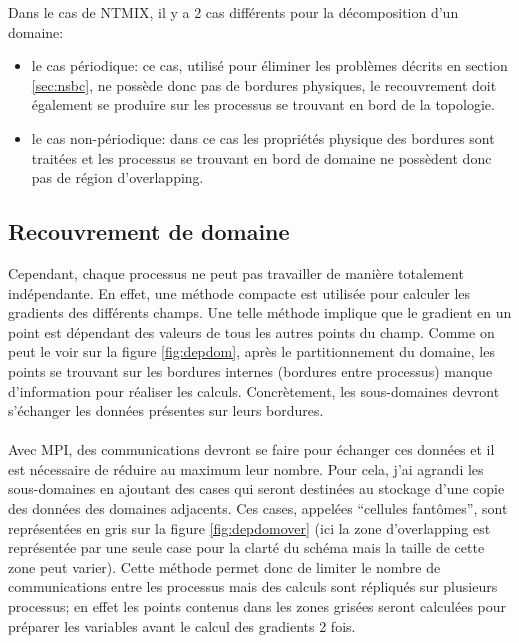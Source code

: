 Dans le cas de NTMIX, il y a 2 cas différents pour la décomposition d'un domaine:
\begin{itemize}
\item le cas périodique: ce cas, utilisé pour éliminer les problèmes décrits en section \ref{sec:nsbc}, ne possède donc pas de bordures physiques, le recouvrement doit également se produire sur les processus se trouvant en bord de la topologie.
\item le cas non-périodique: dans ce cas les propriétés physique des bordures sont traitées et les processus se trouvant en bord de domaine ne possèdent donc pas de région d'overlapping.
\end{itemize}


\subsection{Recouvrement de domaine}
Cependant, chaque processus ne peut pas travailler de manière totalement indépendante. En effet, une méthode compacte est utilisée pour calculer les gradients des différents champs. Une telle méthode implique que le gradient en un point est dépendant des valeurs de tous les autres points du champ. Comme on peut le voir sur la figure \ref{fig:depdom}, après le partitionnement du domaine, les points se trouvant sur les bordures internes (bordures entre processus) manque d'information pour réaliser les calculs. Concrètement, les sous-domaines devront s'échanger les données présentes sur leurs bordures. 

 \paragraph{}Avec MPI, des communications devront se faire pour échanger ces données et il est nécessaire de réduire au maximum leur nombre. Pour cela, j'ai agrandi les sous-domaines en ajoutant des cases qui seront destinées au stockage d'une copie des données des domaines adjacents. Ces cases, appelées ``cellules fantômes'', sont représentées en gris sur la figure \ref{fig:depdomover} (ici la zone d'overlapping est représentée par une seule case pour la clarté du schéma mais la taille de cette zone peut varier).
Cette méthode permet donc de limiter le nombre de communications entre les processus mais des calculs sont répliqués sur plusieurs processus; en effet les points contenus dans les zones grisées seront calculées pour préparer les variables avant le calcul des gradients 2 fois.



